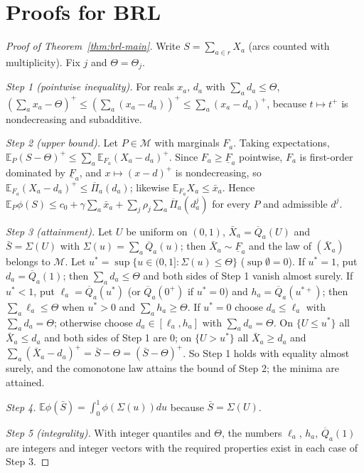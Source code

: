 \documentclass[preprint,12pt]{elsarticle}
\theoremstyle{definition}
\theoremstyle{remark}
\newcommand{\E}{\mathbb{E}}
\newcommand{\cM}{\mathcal{M}}
\newcommand{\Qb}{\overline{Q}}
\newcommand{\Fl}{\underline{F}}
\newcommand{\Pib}{\overline{\Pi}}
\newcommand{\xb}{\bar x}
\newcommand{\pos}[1]{\left(#1\right)^{+}}
\begin{document}
\section{Proofs for BRL}\label{app:brl}

\begin{proof}[Proof of Theorem~\ref{thm:brl-main}]
Write $S=\sum_{a\in r}X_a$ (arcs counted with multiplicity). Fix $j$ and $\Theta=\Theta_j$.

\emph{Step 1 (pointwise inequality).} For reals $x_a$, $d_a$ with $\sum_ad_a\le\Theta$, $\pos{\sum_ax_a-\Theta}\le\pos{\sum_a(x_a-d_a)}\le\sum_a\pos{x_a-d_a}$, because $t\mapsto t^+$ is nondecreasing and subadditive.

\emph{Step 2 (upper bound).} Let $P\in\cM$ with marginals $F_a$. Taking expectations, $\E_P\pos{S-\Theta}\le\sum_a\E_{F_a}\pos{X_a-d_a}$. Since $F_a\ge\Fl_a$ pointwise, $F_a$ is first-order dominated by $\Fl_a$, and $x\mapsto\pos{x-d}$ is nondecreasing, so $\E_{F_a}\pos{X_a-d_a}\le\Pib_a(d_a)$; likewise $\E_{F_a}X_a\le\xb_a$. Hence $\E_P\phi(S)\le c_0+\gamma\sum_a\xb_a+\sum_j\rho_j\sum_a\Pib_a(d^j_a)$ for every $P$ and admissible $d^j$.

\emph{Step 3 (attainment).} Let $U$ be uniform on $(0,1)$, $\bar X_a=\Qb_a(U)$ and $\bar S=\Sigma(U)$ with $\Sigma(u)=\sum_a\Qb_a(u)$; then $\bar X_a\sim\Fl_a$ and the law of $(\bar X_a)$ belongs to $\cM$. Let $u^*=\sup\{u\in(0,1]:\Sigma(u)\le\Theta\}$ ($\sup\emptyset=0$). If $u^*=1$, put $d_a=\Qb_a(1)$; then $\sum_ad_a\le\Theta$ and both sides of Step 1 vanish almost surely. If $u^*<1$, put $\ell_a=\Qb_a(u^*)$ (or $\Qb_a(0^+)$ if $u^*=0$) and $h_a=\Qb_a(u^{*+})$; then $\sum_a\ell_a\le\Theta$ when $u^*>0$ and $\sum_ah_a\ge\Theta$. If $u^*=0$ choose $d_a\le\ell_a$ with $\sum_ad_a=\Theta$; otherwise choose $d_a\in[\ell_a,h_a]$ with $\sum_ad_a=\Theta$. On $\{U\le u^*\}$ all $\bar X_a\le d_a$ and both sides of Step 1 are $0$; on $\{U>u^*\}$ all $\bar X_a\ge d_a$ and $\sum_a\pos{\bar X_a-d_a}=\bar S-\Theta=\pos{\bar S-\Theta}$. So Step 1 holds with equality almost surely, and the comonotone law attains the bound of Step 2; the minima are attained.

\emph{Step 4.} $\E\phi(\bar S)=\int_0^1\phi(\Sigma(u))du$ because $\bar S=\Sigma(U)$.

\emph{Step 5 (integrality).} With integer quantiles and $\Theta$, the numbers $\ell_a$, $h_a$, $\Qb_a(1)$ are integers and integer vectors with the required properties exist in each case of Step 3.
\end{proof}
\end{document}
